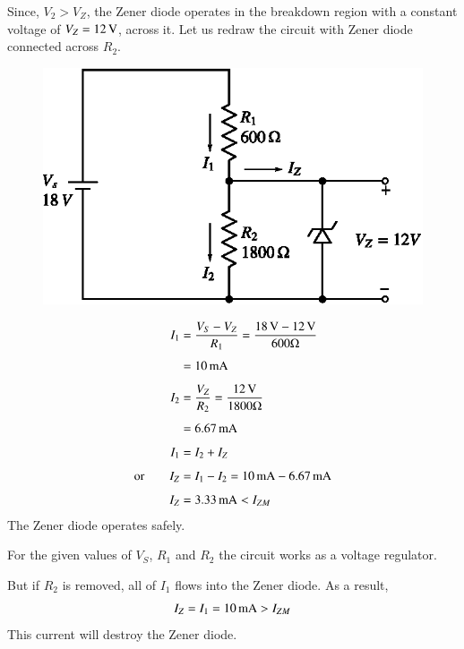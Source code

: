 \begin{solution}
Since, $V_{2}>V_{Z}$, the Zener diode operates in the breakdown region with a constant voltage of $V_{Z}=12\text{\,V}$, across it. Let us redraw the circuit with Zener diode connected across $R_{2}$.
\begin{figure}[H]
\centering
\includegraphics{chap2/sol2.29b.eps}
\end{figure}
\begin{align*}
I_{1} &= \dfrac{V_{S}-V_{Z}}{R_{1}}=\dfrac{18\text{\,V}-12\text{\,V}}{600\Omega}\\[4pt]
&= 10\text{\,mA}\\[4pt]
I_{2} &= \dfrac{V_{Z}}{R_{2}}=\dfrac{12\text{\,V}}{1800\Omega}\\[4pt]
&= 6.67\text{\,mA}\\[4pt]
I_{1} &= I_{2}+I_{Z}\\[4pt]
\text{or}\qquad I_{Z} &= I_{1}-I_{2}=10\text{\,mA}-6.67\text{\,mA}\\[4pt]
I_{Z} &= 3.33\text{\,mA}<I_{ZM}
\end{align*}
The Zener diode operates safely.

For the given values of $V_{S}$, $R_{1}$ and $R_{2}$ the circuit works as a voltage regulator.

But if $R_{2}$ is removed, all of $I_{1}$ flows into the Zener diode. As a result,
$$
I_{Z}=I_{1}=10\text{\,mA}>I_{ZM}
$$
This current will destroy the Zener diode.
\end{solution}

